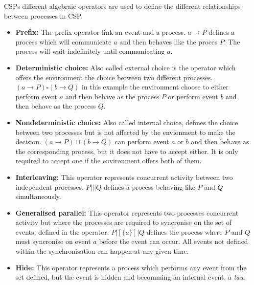 CSPs different algebraic operators are used to define the different relationships between processes in CSP.
\begin{itemize}
    \item \textbf{Prefix:} The prefix operator link an event and a process.
    $a \rightarrow P$ defines a process which will communicate $a$ and then behaves like the proces $P$. The process will wait indefinitely until communicating $a$.
    \item \textbf{Deterministic choice:} Also called external choice is the operator which offers the environment the choice between two different processes. $(a \rightarrow P) \square (b \rightarrow Q)$ in this example the environment choose to either perform event $a$ and then behave as the process $P$ or perform event $b$ and then behave as the process $Q$.
    \item \textbf{Nondeterministic choice:} Also called internal choice, defines the choice between two processes but is not affected by the envionment to make the decision.
    $(a \rightarrow P) \sqcap (b \rightarrow Q)$ can perform event $a$ or $b$ and then behave as the corresponding process, but it does not have to accept either. It is only required to accept one if the environment offers both of them.
    \item \textbf{Interleaving:} This operator represents concurrent activity between two independent processes. $ P  |||  Q$ defines a process behaving like $P$ and $Q$ simultaneously.
     \item \textbf{Generalised parallel:} This operator represents two processes concurrent activity but where the processes are required to syncronise on the set of events, defined in the operator. $ P  |[\{ a \}]|  Q$ defines the process where $P$ and $Q$ must syncronise on event $a$ before the event can occur. All events not defined within the synchronisation can happen at any given time.
     \item \textbf{Hide:} This operator represents a process which performs any event from the set defined, but the event is hidden and becomming an internal event, a \textit{tau}.
\end{itemize}

